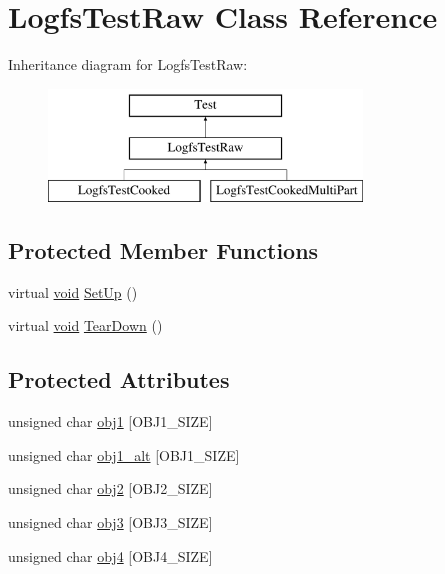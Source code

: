 \hypertarget{class_logfs_test_raw}{\section{Logfs\-Test\-Raw Class Reference}
\label{class_logfs_test_raw}
}
Inheritance diagram for Logfs\-Test\-Raw\-:\begin{figure}[H]
\begin{center}
\leavevmode
\includegraphics[height=3.000000cm]{class_logfs_test_raw}
\end{center}
\end{figure}
\subsection*{Protected Member Functions}
\begin{DoxyCompactItemize}
\item 
virtual \hyperlink{group___n_a_m_e_ga18028b8badbf1ea7e704ccac3c488e82}{void} \hyperlink{group___unit_tests_ga6ad4da1f7c409b092a28457c4841e361}{Set\-Up} ()
\item 
virtual \hyperlink{group___n_a_m_e_ga18028b8badbf1ea7e704ccac3c488e82}{void} \hyperlink{group___unit_tests_ga14c567025394faab5c7628decc578f1f}{Tear\-Down} ()
\end{DoxyCompactItemize}
\subsection*{Protected Attributes}
\begin{DoxyCompactItemize}
\item 
unsigned char \hyperlink{group___unit_tests_ga9a310807ae65fdb582ace246798d9112}{obj1} \mbox{[}O\-B\-J1\-\_\-\-S\-I\-Z\-E\mbox{]}
\item 
unsigned char \hyperlink{group___unit_tests_gab4d553b9c4a87a6f45e032b57f98a751}{obj1\-\_\-alt} \mbox{[}O\-B\-J1\-\_\-\-S\-I\-Z\-E\mbox{]}
\item 
unsigned char \hyperlink{group___unit_tests_ga8ed143a62924cbb11a0150f51b0f39e9}{obj2} \mbox{[}O\-B\-J2\-\_\-\-S\-I\-Z\-E\mbox{]}
\item 
unsigned char \hyperlink{group___unit_tests_gae2971f4ef641d737044260c4f11c1ba0}{obj3} \mbox{[}O\-B\-J3\-\_\-\-S\-I\-Z\-E\mbox{]}
\item 
unsigned char \hyperlink{group___unit_tests_ga538292c7d3fd8ffe5a32cc8b7e43d51c}{obj4} \mbox{[}O\-B\-J4\-\_\-\-S\-I\-Z\-E\mbox{]}
\end{DoxyCompactItemize}


